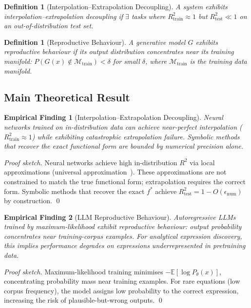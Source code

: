 \documentclass[twoside,11pt]{article}
\newcommand{\Rsq}{R^{2}}
\newcommand{\Rtrain}{R^{2}_{\mathrm{train}}}
\newcommand{\Rtest}{R^{2}_{\mathrm{test}}}
\newtheorem{definition}[theorem]{Definition}
\newtheorem{finding}{Empirical Finding}
\begin{document}
\begin{definition}[Interpolation--Extrapolation Decoupling]
\label{def:decoupling}
A system exhibits interpolation--extrapolation decoupling if $\exists$ tasks where $\Rtrain \approx 1$ but $\Rtest \ll 1$ on an out-of-distribution test set.
\end{definition}

\begin{definition}[Reproductive Behaviour]
\label{def:reproductive}
A generative model $G$ exhibits reproductive behaviour if its output distribution concentrates near its training manifold: $P(G(x) \notin \mathcal{M}_{\text{train}}) < \delta$ for small $\delta$, where $\mathcal{M}_{\text{train}}$ is the training data manifold.
\end{definition}

\subsection{Main Theoretical Result}

\begin{finding}[Interpolation--Extrapolation Decoupling]
\label{prop:interp_extrap_decoupling}
Neural networks trained on in-distribution data can achieve near-perfect interpolation ($\Rtrain \approx 1$) while exhibiting catastrophic extrapolation failure. Symbolic methods that recover the exact functional form are bounded by numerical precision alone.
\end{finding}

\begin{proof}[Proof sketch]
Neural networks achieve high in-distribution $\Rsq$ via local approximations (universal approximation~\citep{hornik1989multilayer}). These approximations are not constrained to match the true functional form; extrapolation requires the correct form. Symbolic methods that recover the exact $f^*$ achieve $\Rtest = 1 - O(\epsilon_{\text{num}})$ by construction. \qed
\end{proof}

\begin{finding}[LLM Reproductive Behaviour]
\label{thm:llm_reproductive}
Autoregressive LLMs trained by maximum-likelihood exhibit reproductive behaviour: output probability concentrates near training-corpus examples. For analytical expression discovery, this implies performance degrades on expressions underrepresented in pretraining data.
\end{finding}

\begin{proof}[Proof sketch]
Maximum-likelihood training minimises $-\mathbb{E}[\log P_\theta(x)]$, concentrating probability mass near training examples. For rare equations (low corpus frequency), the model assigns low probability to the correct expression, increasing the risk of plausible-but-wrong outputs. \qed
\end{proof}
\end{document}
